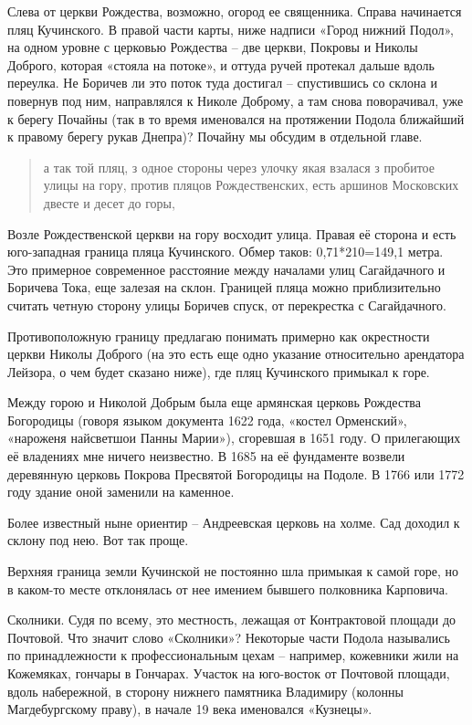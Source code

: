 Слева от церкви Рождества, возможно, огород ее священника. Справа начинается пляц Кучинского. В правой части карты, ниже надписи «Город нижний Подол», на одном уровне с церковью Рождества – две церкви, Покровы и Николы Доброго, которая «стояла на потоке», и оттуда ручей протекал дальше вдоль переулка. Не Боричев ли это поток туда достигал – спустившись со склона и повернув под ним, направлялся к Николе Доброму, а там снова поворачивал, уже к берегу Почайны (так в то время именовался на протяжении Подола ближайший к правому берегу рукав Днепра)? Почайну мы обсудим в отдельной главе.
 
\begin{quotation}
а так той пляц, з одное стороны через улочку якая взалася з пробитое улицы на гору, против пляцов Рождественских, есть аршинов Московских двесте и десет до горы, 
\end{quotation}

Возле Рождественской церкви на гору восходит улица. Правая её сторона и есть юго-западная граница пляца Кучинского. Обмер таков: 0,71*210=149,1 метра. Это примерное современное расстояние между началами улиц Сагайдачного и Боричева Тока, еще залезая на склон. Границей пляца можно приблизительно считать четную сторону улицы Боричев спуск, от перекрестка с Сагайдачного.

Противоположную границу предлагаю понимать примерно как окрестности церкви Николы Доброго (на это есть еще одно указание относительно арендатора Лейзора, о чем будет сказано ниже), где пляц Кучинского примыкал к горе. 

Между горою и Николой Добрым была еще армянская церковь Рождества Богородицы (говоря языком документа 1622 года, «костел Орменский», «нароженя найсветшои Панны Марии»), сгоревшая в 1651 году. О прилегающих её владениях мне ничего неизвестно. В 1685 на её фундаменте возвели деревянную церковь Покрова Пресвятой Богородицы на Подоле. В 1766 или 1772 году здание оной заменили на каменное.

Более известный ныне ориентир – Андреевская церковь на холме. Сад доходил к склону под нею. Вот так проще.

Верхняя граница земли Кучинской не постоянно шла примыкая к самой горе, но в каком-то месте отклонялась от нее имением бывшего полковника Карповича.

Сколники. Судя по всему, это местность, лежащая от Контрактовой площади до Почтовой. Что значит слово «Сколники»? Некоторые части Подола назывались по принадлежности к профессиональным цехам – например, кожевники жили на Кожемяках, гончары в Гончарах. Участок на юго-восток от Почтовой площади, вдоль набережной, в сторону нижнего памятника Владимиру (колонны Магдебургскому праву), в начале 19 века именовался «Кузнецы».

